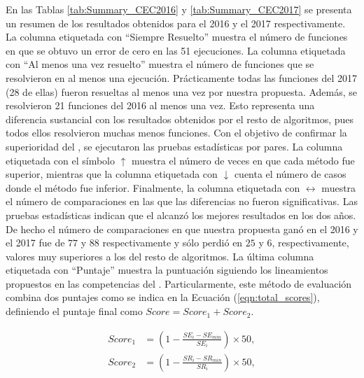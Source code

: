 En las Tablas \ref{tab:Summary_CEC2016} y \ref{tab:Summary_CEC2017} se presenta un resumen de los resultados obtenidos para el \CEC{} 2016 y el \CEC{} 2017 respectivamente.
%
La columna etiquetada con ``Siempre Resuelto'' muestra el número de funciones en que se obtuvo un error de cero en las 51 ejecuciones.
%
La columna etiquetada con ``Al menos una vez resuelto'' muestra el número de funciones que se resolvieron en al menos una ejecución.
%
Prácticamente todas las funciones del \CEC{} 2017 (28 de ellas) fueron resueltas al menos una vez por nuestra propuesta.
%
Además, se resolvieron 21 funciones del \CEC{} 2016 al menos una vez.
%
Esto representa una diferencia sustancial con los resultados obtenidos por el resto de algoritmos, pues todos ellos resolvieron muchas menos funciones.
%
Con el objetivo de confirmar la superioridad del \DEEDM{}, se ejecutaron las pruebas estadísticas por pares.
%
La columna etiquetada con el símbolo $\uparrow$ muestra el número de veces en que cada método fue superior, mientras que la columna etiquetada 
con $\downarrow$ cuenta el número de casos donde el método fue inferior.
%
Finalmente, la columna etiquetada con $\longleftrightarrow$ muestra el número de comparaciones en las que las diferencias no fueron significativas.
%
Las pruebas estadísticas indican que el \DEEDM{} alcanzó los mejores resultados en los dos años.
%
De hecho el número de comparaciones en que nuestra propuesta ganó en el \CEC{} 2016 y el \CEC{} 2017 fue de $77$ y $88$ respectivamente y
sólo perdió en $25$ y $6$, respectivamente, valores muy superiores a los del resto de algoritmos.
%
La última columna etiquetada con ``Puntaje'' muestra la puntuación siguiendo los lineamientos propuestos en las competencias del \CEC{}.
%
Particularmente, este método de evaluación combina dos puntajes como se indica en la Ecuación (\ref{eqn:total_scores}),
definiendo el puntaje final como $Score = Score_1 + Score_2$.

%
\begin{equation}\label{eqn:total_scores}
\begin{split}
Score_1 &= \left (1 - \frac{SE_i - SE_{min}}{SE_i} \right) \times 50, \\
Score_2 &= \left  (1 - \frac{SR_i - SR_{min}}{SR_i} \right ) \times 50, \\
\end{split}
\end{equation}

